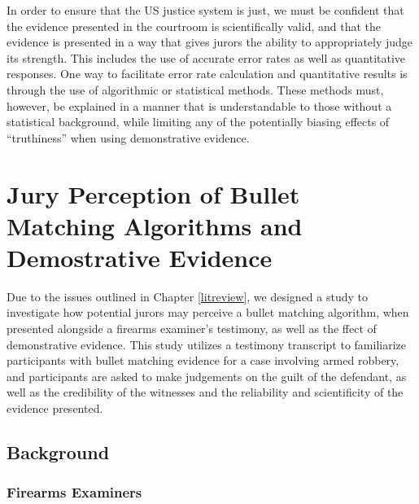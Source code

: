 \documentclass[print]{nuthesis}
\begin{document}
In order to ensure that the US justice system is just, we must be confident that the evidence presented in the courtroom is scientifically valid, and that the evidence is presented in a way that gives jurors the ability to appropriately judge its strength.
This includes the use of accurate error rates as well as quantitative responses.
One way to facilitate error rate calculation and quantitative results is through the use of algorithmic or statistical methods.
These methods must, however, be explained in a manner that is understandable to those without a statistical background, while limiting any of the potentially biasing effects of ``truthiness'' when using demonstrative evidence.

\hypertarget{study1}{%
\chapter{Jury Perception of Bullet Matching Algorithms and Demostrative Evidence}\label{study1}}

Due to the issues outlined in Chapter \ref{litreview}, we designed a study to investigate how potential jurors may perceive a bullet matching algorithm, when presented alongside a firearms examiner's testimony, as well as the ffect of demonstrative evidence.
This study utilizes a testimony transcript to familiarize participants with bullet matching evidence for a case involving armed robbery, and participants are asked to make judgements on the guilt of the defendant, as well as the credibility of the witnesses and the reliability and scientificity of the evidence presented.

\hypertarget{background}{%
\section{Background}\label{background}}

\hypertarget{firearms-examiners}{%
\subsection{Firearms Examiners}\label{firearms-examiners}}
\end{document}
